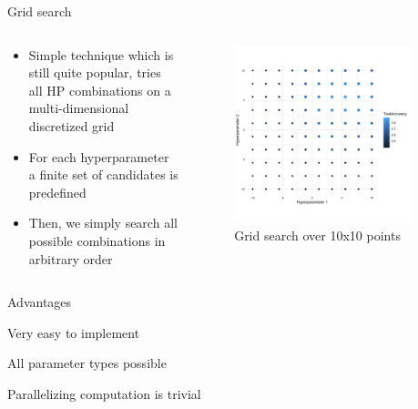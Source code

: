 \begin{frame}{Grid search}

\begin{columns}
\begin{column}{0.49\textwidth}
\begin{itemize}
\item Simple technique which is still quite popular, tries all
HP combinations on a multi-dimensional discretized grid
\item For each hyperparameter a finite set of candidates is predefined
\item Then, we simply search all possible combinations in arbitrary order
\end{itemize}
\end{column}
\begin{column}{0.49\textwidth}
\vspace*{-0.8cm}
\begin{center}
\begin{figure}
\includegraphics[width=0.9\textwidth]{images/grid.png}
\caption*{Grid search over 10x10 points}
\end{figure}
\end{center}
\end{column}
\end{columns}

\framebreak

\begin{blocki}{Advantages}
\item Very easy to implement
\item All parameter types possible
\item Parallelizing computation is trivial
\end{blocki}


\end{frame}
